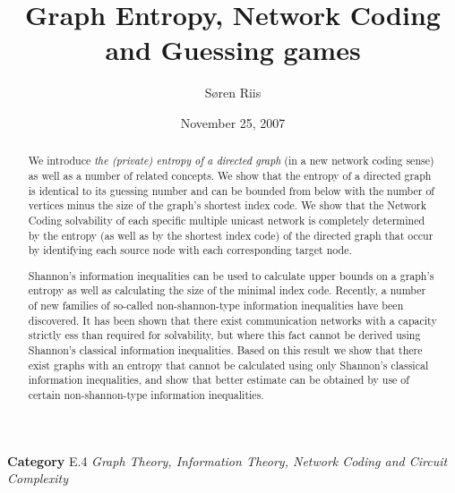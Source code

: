 \documentclass[12pt]{article}
\begin{document}
\title{Graph Entropy, Network Coding and Guessing games}
\author{ S\o ren Riis} 
\date{November 25, 2007}
\maketitle
\begin{abstract}
We introduce  {\it the (private) entropy of a directed graph} (in a new network coding sense) as well as a number of related concepts. We show that the entropy of a directed graph is identical to its guessing number and can be bounded from below with  the number of vertices minus the size of the graph's shortest index code.  We show that the Network Coding solvability of each specific multiple unicast network is completely determined by the entropy (as well as by the shortest index code) of the directed graph that occur by identifying each source node with each corresponding target node.

Shannon's information inequalities can be used to calculate upper bounds on a graph's entropy
as well as calculating the size of the minimal index code.  Recently, a number of new families of 
so-called non-shannon-type information inequalities have been discovered. It 
has been shown that there exist communication networks with a capacity strictly 
ess than required for solvability, but where this fact cannot be derived using 
Shannon's classical information inequalities. Based on this result we show that 
there exist graphs with an entropy  that cannot be 
calculated using only Shannon's classical information inequalities, and show 
that better estimate can be obtained  by use of certain non-shannon-type 
information inequalities.

\end{abstract}

\noindent
{\bf Category} E.4 {\it Graph Theory, Information Theory, Network Coding and Circuit Complexity}
\end{document}
